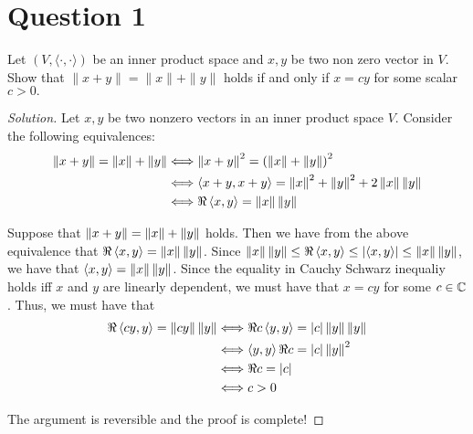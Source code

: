\section{Question 1}
\horz
Let $(V,\langle \cdot, \cdot \rangle)$ be an inner product space and $x,y$ be two non zero vector in $V.$ 
Show that $\|x+y\| = \|x\|+\|y\|$ holds if and only if $x=cy$ for some scalar $c >0.$
\horz

\begin{proof}[Solution]
    Let $x,y$ be two nonzero vectors in an inner product space $V$. Consider the following equivalences:
    \begin{align*}
	\norm{x+y} = \norm{x} + \norm{y} &\Longleftrightarrow  \norm{x+y}^{2} = \left( \norm{x} + \norm{y} \right)^{2} \\
	&\Longleftrightarrow \ip{x+y, x+y} = \norm{x}^{2} + \norm{y}^2 + 2 \norm{x} \norm{y} \\
	&\Longleftrightarrow \Re \ip{x,y} = \norm{x} \norm{y}
    \end{align*}

    Suppose that $\norm{x+y} = \norm{x} + \norm{y}$ holds. Then we have from the above equivalence that $\Re \ip{x,y} = \norm{x} \norm{y}$. Since $\norm{x}\norm{y} \le \Re \ip{x,y} \le \abs{\ip{x,y}} \le \norm{x}\norm{y}$, we have that $\ip{x,y}  = \norm{x}\norm{y}$. Since the equality in Cauchy Schwarz inequaliy holds iff $x$ and $y$ are linearly dependent, we must have that $x=cy$ for some $c\in \C$. Thus, we must have that
    \begin{align*}
	\Re \ip{cy, y} = \norm{cy}\norm{y} &\Longleftrightarrow \Re{c \ip{y,y}} = \abs{c} \norm{y}\norm{y} \\
	&\Longleftrightarrow \ip{y,y} \Re c = \abs{c} \norm{y}^{2} \\
	&\Longleftrightarrow \Re{c} = \abs{c} \\
	&\Longleftrightarrow c>0
    \end{align*}

    The argument is reversible and the proof is complete!
\end{proof}
